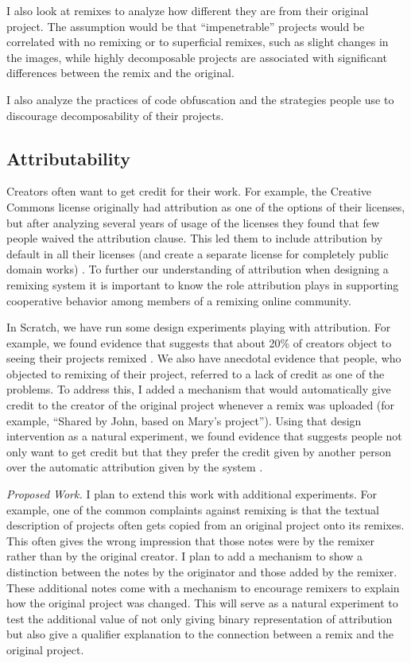 I also look at remixes to analyze how different they are from their original project. 
The assumption would be that ``impenetrable'' projects would be correlated with no remixing or to superficial remixes, such as slight changes in the images, while highly decomposable projects are associated with significant differences between the remix and the original.

I also analyze the practices of code obfuscation and the strategies people use to discourage decomposability of their projects.

\subsection{Attributability}
Creators often want to get credit for their work. 
For example, the Creative Commons license originally had attribution as one of the options of their licenses, but after analyzing several years of usage of the licenses they found that few people waived the attribution clause. 
This led them to include attribution by default in all their licenses (and create a separate license for completely public domain works) \citep{brown_announcing_2004}.
To further our understanding of attribution when designing a remixing system it is important to know the role attribution plays in supporting cooperative behavior among members of a remixing online community.

In Scratch, we have run some design experiments playing with attribution. 
For example, we found evidence that suggests that about 20\% of creators object to seeing their projects remixed \citep{hill_responses_2010}.
We also have anecdotal evidence that people, who objected to remixing of their project, referred to a lack of credit as one of the problems.
To address this, I added a mechanism that would automatically give credit to the creator of the original project whenever a remix was uploaded (for example, ``Shared by John, based on Mary's project'').
Using that design intervention as a natural experiment, we found evidence that suggests people not only want to get credit but that they prefer the credit given by another person over the automatic attribution given by the system \cite{monroy-hernandez_computers_2011}. 

\emph{Proposed Work.}
I plan to extend this work with additional experiments.
For example, one of the common complaints against remixing is that the textual description of projects often gets copied from an original project onto its remixes.
This often gives the wrong impression that those notes were by the remixer rather than by the original creator.
I plan to add a mechanism to show a distinction between the notes by the originator and those added by the remixer.
These additional notes come with a mechanism to encourage remixers to explain how the original project was changed.
This will serve as a natural experiment to test the additional value of not only giving binary representation of attribution but also give a qualifier explanation to the connection between a remix and the original project.

